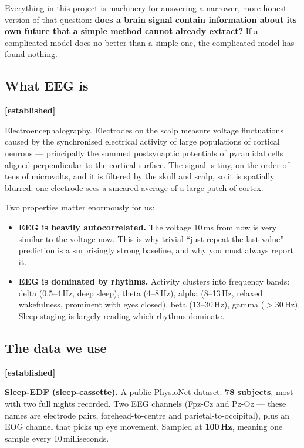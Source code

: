 \documentclass[11pt]{article}
\begin{document}
Everything in this project is machinery for answering a narrower, more honest
version of that question: \textbf{does a brain signal contain information about
its own future that a simple method cannot already extract?} If a complicated
model does no better than a simple one, the complicated model has found nothing.

\subsection{What EEG is} \textbf{[established]}

Electroencephalography. Electrodes on the scalp measure voltage fluctuations
caused by the synchronised electrical activity of large populations of cortical
neurons --- principally the summed postsynaptic potentials of pyramidal cells
aligned perpendicular to the cortical surface. The signal is tiny, on the order of
tens of microvolts, and it is filtered by the skull and scalp, so it is spatially
blurred: one electrode sees a smeared average of a large patch of cortex.

Two properties matter enormously for us:

\begin{itemize}
\item \textbf{EEG is heavily autocorrelated.} The voltage 10\,ms from now is very
similar to the voltage now. This is why trivial ``just repeat the last value''
prediction is a surprisingly strong baseline, and why you must always report it.
\item \textbf{EEG is dominated by rhythms.} Activity clusters into frequency
bands: delta (0.5--4\,Hz, deep sleep), theta (4--8\,Hz), alpha (8--13\,Hz, relaxed
wakefulness, prominent with eyes closed), beta (13--30\,Hz), gamma ($>$30\,Hz).
Sleep staging is largely reading which rhythms dominate.
\end{itemize}

\subsection{The data we use} \textbf{[established]}

\textbf{Sleep-EDF (sleep-cassette).} A public PhysioNet dataset. \textbf{78
subjects}, most with two full nights recorded. Two EEG channels (Fpz-Cz and
Pz-Oz --- these names are electrode pairs, forehead-to-centre and
parietal-to-occipital), plus an EOG channel that picks up eye movement. Sampled at
\textbf{100\,Hz}, meaning one sample every 10\,milliseconds.
\end{document}

